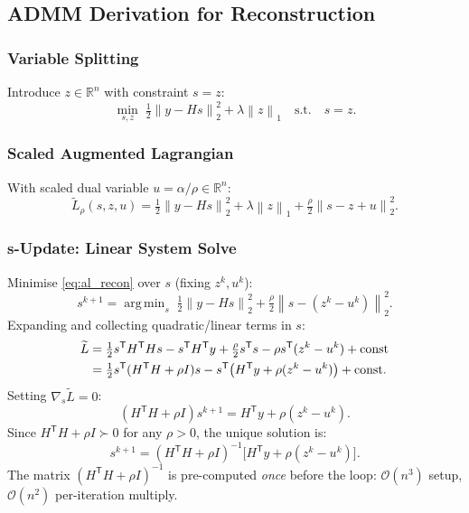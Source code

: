 \documentclass[journal,twoside,10pt]{IEEEtran}
\DeclareMathOperator*{\argmin}{arg\,min}
\newcommand{\norm}[1]{\left\lVert#1\right\rVert}
\newcommand{\R}{\mathbb{R}}
\newcommand{\T}{^{\mathsf{T}}}
\begin{document}
\subsection{ADMM Derivation for Reconstruction}
\label{ssec:admm_recon}

\subsubsection{Variable Splitting}

Introduce $z\in\R^n$ with constraint $s=z$:
\begin{equation}
  \min_{s,z}\;\tfrac{1}{2}\norm{y-Hs}_2^2+\lambda\norm{z}_1
  \quad\text{s.t.}\quad s=z.
  \label{eq:lasso_split}
\end{equation}

\subsubsection{Scaled Augmented Lagrangian}

With scaled dual variable $u=\alpha/\rho\in\R^n$:
\begin{equation}
  \widetilde{L}_\rho(s,z,u)=\tfrac{1}{2}\norm{y-Hs}_2^2+\lambda\norm{z}_1+\tfrac{\rho}{2}\norm{s-z+u}_2^2.
  \label{eq:al_recon}
\end{equation}

\subsubsection{\textbf{s}-Update: Linear System Solve}

Minimise \eqref{eq:al_recon} over $s$ (fixing $z^k,u^k$):
\begin{equation}
  s^{k+1}=\argmin_s\;\tfrac{1}{2}\norm{y-Hs}_2^2+\tfrac{\rho}{2}\norm{s-(z^k-u^k)}_2^2.
\end{equation}
Expanding and collecting quadratic/linear terms in $s$:
\begin{align}
  \widetilde{L}&=\tfrac{1}{2}s\T H\T Hs - s\T H\T y
               + \tfrac{\rho}{2}s\T s - \rho s\T(z^k-u^k)+\mathrm{const}\notag\\
               &=\tfrac{1}{2}s\T(H\T H+\rho I)s - s\T\bigl(H\T y+\rho(z^k-u^k)\bigr)+\mathrm{const}.
\end{align}
Setting $\nabla_s\widetilde{L}=0$:
\begin{equation}
  (H\T H+\rho I)s^{k+1} = H\T y+\rho(z^k-u^k).
\end{equation}
Since $H\T H+\rho I\succ 0$ for any $\rho>0$, the unique solution is:
\begin{equation}
  \boxed{s^{k+1}=(H\T H+\rho I)^{-1}\!\bigl[H\T y+\rho(z^k-u^k)\bigr].}
  \label{eq:s_update}
\end{equation}
The matrix $(H\T H+\rho I)^{-1}$ is pre-computed \emph{once} before the loop: $\mathcal{O}(n^3)$ setup,
$\mathcal{O}(n^2)$ per-iteration multiply.
\end{document}
